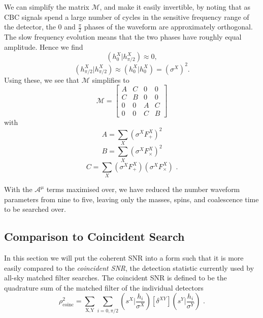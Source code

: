 \documentclass[11pt]{cuthesis}
\newcommand{\fs}{\text{ .}}
\begin{document}
We can simplify the matrix $\mathcal{M}$, and make it easily invertible, by noting that as CBC signals spend a large number of cycles in the sensitive frequency range of the detector, the $0$ and $\frac{\pi}{2}$ phases of the waveform are approximately orthogonal. The slow frequency evolution means that the two phases have roughly equal amplitude. Hence we find 
\begin{equation}
(h_0^X|h_{\pi/2}^X)\approx 0 ,
\end{equation}
\begin{equation}
(h_{\pi/2}^X|h_{\pi/2}^X)\approx (h_0^X|h_0^X) = (\sigma^X)^2 \textbf{.}
\end{equation}
Using these, we see that $\mathcal{M}$  simplifies to
\[
\mathcal{M}
=
\begin{bmatrix} \label{projection matrix}
A & C & 0 & 0 \\
C & B & 0 & 0 \\
0 & 0 & A & C \\
0 & 0 & C & B 
\end{bmatrix}
\] 
with 
\begin{equation}
A = \sum_X (\sigma^X F_+^X)^2
\end{equation}
\begin{equation}
B = \sum_X (\sigma^X F_\times^X)^2
\end{equation}
\begin{equation} \label{C eqn}
C = \sum_X (\sigma^X F_+^X)(\sigma^X F_\times^X) \fs
\end{equation}

With the  $\mathcal{A}^\mu$ terms maximised over, we have reduced the number waveform parameters from nine to five, leaving only the masses, spins, and coalescence time to be searched over. 

\subsection{Comparison to Coincident Search} \label{sec: coinc compare}
In this section we will put the coherent SNR into a form such that it is more easily compared to the \textit{coincident SNR}, the detection statistic currently used by all-sky matched filter searches. The coincident SNR is defined to be the quadrature sum of the matched filter of the individual detectors
\begin{equation} \label{rhocoinc}
\rho^2_\text{coinc} = \sum_\text{X,Y} \sum_{i=0,\pi/2} \left( s^X \bigg| \frac{h_i}{\sigma^X} \right)[\delta^{XY}]\left( s^Y \bigg| \frac{h_i}{\sigma^Y} \right) \fs
\end{equation}
\end{document}
